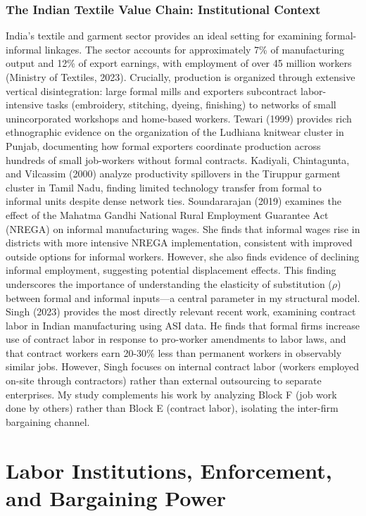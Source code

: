 \subsubsection{The Indian Textile Value Chain: Institutional Context}
India's textile and garment sector provides an ideal setting for examining formal-informal linkages. The sector accounts for approximately 7\% of manufacturing output and 12\% of export earnings, with employment of over 45 million workers (Ministry of Textiles, 2023). Crucially, production is organized through extensive vertical disintegration: large formal mills and exporters subcontract labor-intensive tasks (embroidery, stitching, dyeing, finishing) to networks of small unincorporated workshops and home-based workers.
Tewari (1999) provides rich ethnographic evidence on the organization of the Ludhiana knitwear cluster in Punjab, documenting how formal exporters coordinate production across hundreds of small job-workers without formal contracts. Kadiyali, Chintagunta, and Vilcassim (2000) analyze productivity spillovers in the Tiruppur garment cluster in Tamil Nadu, finding limited technology transfer from formal to informal units despite dense network ties.
Soundararajan (2019) examines the effect of the Mahatma Gandhi National Rural Employment Guarantee Act (NREGA) on informal manufacturing wages. She finds that informal wages rise in districts with more intensive NREGA implementation, consistent with improved outside options for informal workers. However, she also finds evidence of declining informal employment, suggesting potential displacement effects. This finding underscores the importance of understanding the elasticity of substitution ($\rho$) between formal and informal inputs—a central parameter in my structural model.
Singh (2023) provides the most directly relevant recent work, examining contract labor in Indian manufacturing using ASI data. He finds that formal firms increase use of contract labor in response to pro-worker amendments to labor laws, and that contract workers earn 20-30\% less than permanent workers in observably similar jobs. However, Singh focuses on internal contract labor (workers employed on-site through contractors) rather than external outsourcing to separate enterprises. My study complements his work by analyzing Block F (job work done by others) rather than Block E (contract labor), isolating the inter-firm bargaining channel.

\section{ Labor Institutions, Enforcement, and Bargaining Power}
